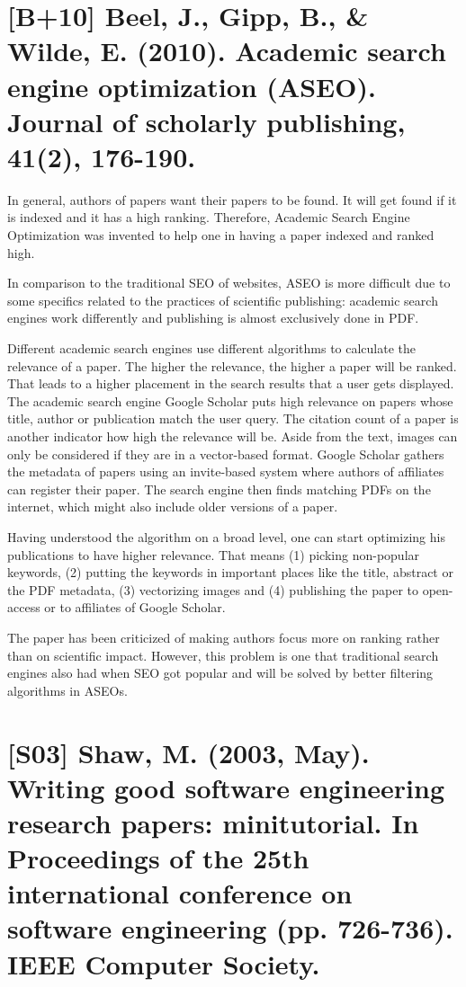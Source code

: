 \documentclass[a4paper,12pt,english]{scrartcl}
\newcommand{\papertitle}[2]{
	\section{[#1] #2}
}
\begin{document}
\pagestyle{fancy} %

\papertitle{B+10}{Beel, J., Gipp, B., \& Wilde, E. (2010). Academic search engine optimization (ASEO). Journal of scholarly publishing, 41(2), 176-190.}

In general, authors of papers want their papers to be found. It will get found if it is indexed and it has a high ranking.
Therefore, Academic Search Engine Optimization was invented to help one in having a paper indexed and ranked high.

In comparison to the traditional SEO of websites, ASEO is more difficult due to some specifics related to the practices of scientific publishing:
academic search engines work differently and publishing is almost exclusively done in PDF.

Different academic search engines use different algorithms to calculate the relevance of a paper.
The higher the relevance, the higher a paper will be ranked.
That leads to a higher placement in the search results that a user gets displayed.
The academic search engine Google Scholar puts high relevance on papers whose title, author or publication match the user query.
The citation count of a paper is another indicator how high the relevance will be.
Aside from the text, images can only be considered if they are in a vector-based format.
Google Scholar gathers the metadata of papers using an invite-based system where authors of affiliates can register their paper.
The search engine then finds matching PDFs on the internet, which might also include older versions of a paper.

Having understood the algorithm on a broad level, one can start optimizing his publications to have higher relevance.
That means
(1) picking non-popular keywords,
(2) putting the keywords in important places like the title, abstract or the PDF metadata,
(3) vectorizing images and
(4) publishing the paper to open-access or to affiliates of Google Scholar.

The paper has been criticized of making authors focus more on ranking rather than on scientific impact.
However, this problem is one that traditional search engines also had when SEO got popular and will be solved by better filtering algorithms in ASEOs.

\newpage

\papertitle{S03}{Shaw, M. (2003, May). Writing good software engineering research papers: minitutorial. In Proceedings of the 25th international conference on software engineering (pp. 726-736). IEEE Computer Society.}
\end{document}
